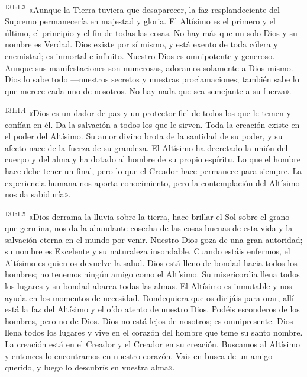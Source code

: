 \par
\textsuperscript{131:1.3} «Aunque la Tierra tuviera que desaparecer, la faz resplandeciente del Supremo permanecería en majestad y gloria. El Altísimo es el primero y el último, el principio y el fin de todas las cosas. No hay más que un solo Dios y su nombre es Verdad. Dios existe por sí mismo, y está exento de toda cólera y enemistad; es inmortal e infinito. Nuestro Dios es omnipotente y generoso. Aunque sus manifestaciones son numerosas, adoramos solamente a Dios mismo. Dios lo sabe todo ---nuestros secretos y nuestras proclamaciones; también sabe lo que merece cada uno de nosotros. No hay nada que sea semejante a su fuerza».

\par
\textsuperscript{131:1.4} «Dios es un dador de paz y un protector fiel de todos los que le temen y confían en él. Da la salvación a todos los que le sirven. Toda la creación existe en el poder del Altísimo. Su amor divino brota de la santidad de su poder, y su afecto nace de la fuerza de su grandeza. El Altísimo ha decretado la unión del cuerpo y del alma y ha dotado al hombre de su propio espíritu. Lo que el hombre hace debe tener un final, pero lo que el Creador hace permanece para siempre. La experiencia humana nos aporta conocimiento, pero la contemplación del Altísimo nos da sabiduría».

\par
\textsuperscript{131:1.5} «Dios derrama la lluvia sobre la tierra, hace brillar el Sol sobre el grano que germina, nos da la abundante cosecha de las cosas buenas de esta vida y la salvación eterna en el mundo por venir. Nuestro Dios goza de una gran autoridad; su nombre es Excelente y su naturaleza insondable. Cuando estáis enfermos, el Altísimo es quien os devuelve la salud. Dios está lleno de bondad hacia todos los hombres; no tenemos ningún amigo como el Altísimo. Su misericordia llena todos los lugares y su bondad abarca todas las almas. El Altísimo es inmutable y nos ayuda en los momentos de necesidad. Dondequiera que os dirijáis para orar, allí está la faz del Altísimo y el oído atento de nuestro Dios. Podéis esconderos de los hombres, pero no de Dios. Dios no está lejos de nosotros; es omnipresente. Dios llena todos los lugares y vive en el corazón del hombre que teme su santo nombre. La creación está en el Creador y el Creador en su creación. Buscamos al Altísimo y entonces lo encontramos en nuestro corazón. Vais en busca de un amigo querido, y luego lo descubrís en vuestra alma».

